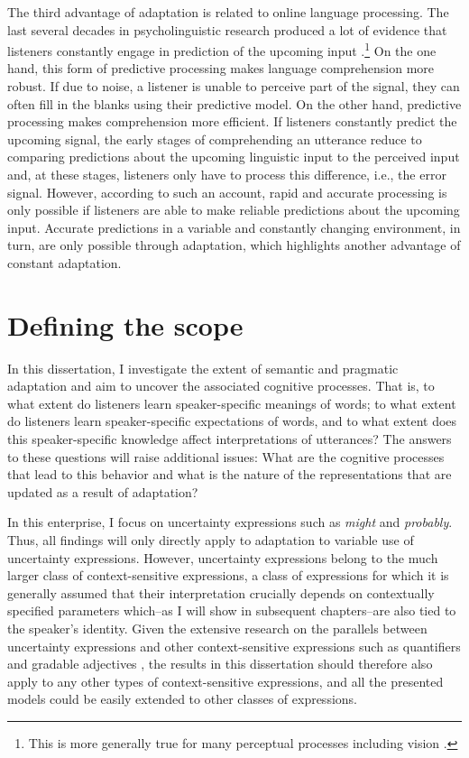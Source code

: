 The third advantage of adaptation is related to online language processing. The last several decades
in psycholinguistic research produced a lot of evidence that listeners constantly engage in prediction of 
the upcoming input .\footnote{This is more generally true for many perceptual 
processes including vision \parencite[see, e.g.,][]{Clark2013,Friston2010}.} 
On the one hand, this form of predictive processing makes language comprehension more robust. If due to noise,
a listener is unable to perceive part of the signal, they can often fill in the blanks using their predictive model.
On the other hand, predictive processing makes comprehension more efficient. 
If listeners constantly predict the upcoming signal, the early stages of comprehending an utterance 
reduce to comparing predictions about the upcoming linguistic input to the perceived input and, at these stages, 
listeners only have to process this difference, i.e., the error signal. However, according to such an account,
rapid and accurate processing is only possible if listeners are able to make reliable predictions about the upcoming
input. Accurate predictions in a variable and constantly changing environment, in turn, are only possible through
 adaptation, which highlights another advantage of constant adaptation.

\section{Defining the scope}

In this dissertation, I investigate the extent of semantic and pragmatic adaptation and aim to uncover
the associated cognitive processes. That is, to what extent do listeners learn speaker-specific
meanings of words; to what extent do listeners learn speaker-specific expectations of words,
and to what extent does this speaker-specific knowledge affect interpretations of utterances? 
The answers to these questions will raise additional issues: What are the cognitive processes 
that lead to this behavior and what is the nature of the representations that are updated as a result of 
adaptation?

In this enterprise, I focus on uncertainty expressions
such as \emph{might} and \emph{probably}. Thus, all findings will only directly apply to 
adaptation to variable use of uncertainty expressions. However, uncertainty expressions 
belong to the much larger class of context-sensitive expressions, a class of expressions for 
which it is generally assumed  that their interpretation crucially depends on contextually 
specified parameters which--as I will show in subsequent chapters--are
also tied to the speaker's identity. Given the extensive research on the parallels between
uncertainty expressions and other context-sensitive expressions such as quantifiers and
gradable adjectives \cite{Lassiter2016, Scholler2017}, the results in this dissertation
should therefore also apply to any other types of context-sensitive expressions, and all
the presented models could be easily extended to other classes of expressions. 

